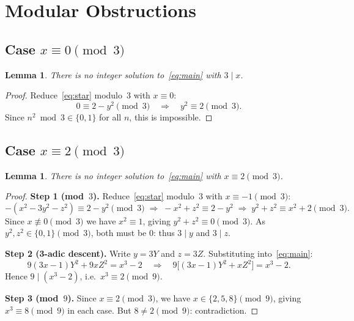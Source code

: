 \documentclass[12pt,a4paper]{article}
\newtheorem{lemma}[theorem]{Lemma}
\theoremstyle{definition}
\begin{document}
\section{Modular Obstructions}
\label{sec:obstructions}

\subsection{Case \texorpdfstring{$x \equiv 0 \pmod{3}$}{x ≡ 0 (mod 3)}}

\begin{lemma}\label{lem:case0}
  There is no integer solution to~\eqref{eq:main} with $3 \mid x$.
\end{lemma}

\begin{proof}
  Reduce~\eqref{eq:star} modulo~$3$ with $x \equiv 0$:
  \[
    0 \equiv 2 - y^2 \pmod{3}
    \quad\Longrightarrow\quad y^2 \equiv 2 \pmod{3}.
  \]
  Since $n^2 \bmod 3 \in \{0,1\}$ for all $n$, this is impossible.
\end{proof}

\subsection{Case \texorpdfstring{$x \equiv 2 \pmod{3}$}{x ≡ 2 (mod 3)}}

\begin{lemma}\label{lem:case2}
  There is no integer solution to~\eqref{eq:main} with $x \equiv 2 \pmod{3}$.
\end{lemma}

\begin{proof}
  \textbf{Step 1 (mod~$3$).}
  Reduce~\eqref{eq:star} modulo~$3$ with $x \equiv -1 \pmod{3}$:
  \[
    -(x^2 - 3y^2 - z^2) \equiv 2 - y^2 \pmod{3}
    \;\Longrightarrow\;
    -x^2 + z^2 \equiv 2 - y^2
    \;\Longrightarrow\;
    y^2 + z^2 \equiv x^2 + 2 \pmod{3}.
  \]
  Since $x \not\equiv 0 \pmod{3}$ we have $x^2 \equiv 1$, giving
  $y^2 + z^2 \equiv 0 \pmod{3}$.
  As $y^2, z^2 \in \{0,1\} \pmod{3}$, both must be $0$: thus $3\mid y$
  and $3 \mid z$.

  \textbf{Step 2 (3-adic descent).}
  Write $y = 3Y$ and $z = 3Z$.  Substituting into~\eqref{eq:main}:
  \[
    9(3x-1)Y^2 + 9xZ^2 = x^3 - 2
    \quad\Longrightarrow\quad
    9\bigl[(3x-1)Y^2 + xZ^2\bigr] = x^3 - 2.
  \]
  Hence $9 \mid (x^3 - 2)$, i.e.\ $x^3 \equiv 2 \pmod{9}$.

  \textbf{Step 3 (mod~$9$).}
  Since $x \equiv 2 \pmod{3}$, we have $x \in \{2,5,8\} \pmod{9}$, giving
  $x^3 \equiv 8 \pmod{9}$ in each case.  But $8 \neq 2 \pmod{9}$: contradiction.
\end{proof}
\end{document}

